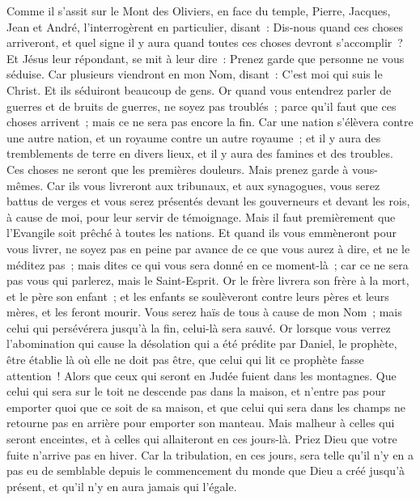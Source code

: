 \begin{multicols}{2}
Comme il s'assit sur le Mont des Oliviers, en face du temple, Pierre, Jacques, Jean et André, l'interrogèrent en particulier,
disant~: Dis-nous quand ces choses arriveront, et quel signe il y aura quand toutes ces choses devront s'accomplir~?
Et Jésus leur répondant, se mit à leur dire~: Prenez garde que personne ne vous séduise.
Car plusieurs viendront en mon Nom, disant~: C'est moi qui suis le Christ. Et ils séduiront beaucoup de gens.
Or quand vous entendrez parler de guerres et de bruits de guerres, ne soyez pas troublés~; parce qu'il faut que ces choses arrivent~; mais ce ne sera pas encore la fin.
Car une nation s'élèvera contre une autre nation, et un royaume contre un autre royaume~; et il y aura des tremblements de terre en divers lieux, et il y aura des famines et des troubles. Ces choses ne seront que les premières douleurs.
Mais prenez garde à vous-mêmes. Car ils vous livreront aux tribunaux, et aux synagogues, vous serez battus de verges et vous serez présentés devant les gouverneurs et devant les rois, à cause de moi, pour leur servir de témoignage.
Mais il faut premièrement que l'Evangile soit prêché à toutes les nations.
Et quand ils vous emmèneront pour vous livrer, ne soyez pas en peine par avance de ce que vous aurez à dire, et ne le méditez pas~; mais dites ce qui vous sera donné en ce moment-là~; car ce ne sera pas vous qui parlerez, mais le Saint-Esprit.
Or le frère livrera son frère à la mort, et le père son enfant~; et les enfants se soulèveront contre leurs pères et leurs mères, et les feront mourir.
Vous serez haïs de tous à cause de mon Nom~; mais celui qui persévérera jusqu'à la fin, celui-là sera sauvé.
Or lorsque vous verrez l'abomination qui cause la désolation qui a été prédite par Daniel, le prophète, être établie là où elle ne doit pas être, que celui qui lit ce prophète fasse attention~! Alors que ceux qui seront en Judée fuient dans les montagnes.
Que celui qui sera sur le toit ne descende pas dans la maison, et n'entre pas pour emporter quoi que ce soit de sa maison,
et que celui qui sera dans les champs ne retourne pas en arrière pour emporter son manteau.
Mais malheur à celles qui seront enceintes, et à celles qui allaiteront en ces jours-là.
Priez Dieu que votre fuite n'arrive pas en hiver.
Car la tribulation, en ces jours, sera telle qu'il n'y en a pas eu de semblable depuis le commencement du monde que Dieu a créé jusqu'à présent, et qu'il n'y en aura jamais qui l'égale.

\end{multicols}
